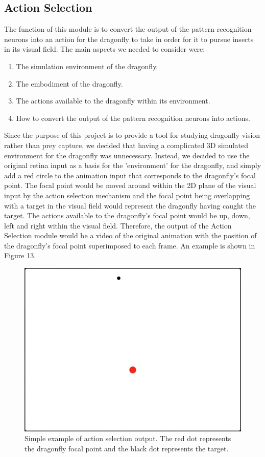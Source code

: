 \documentclass[a4paper,11pt]{article}
\begin{document}
\subsection{Action Selection}

The function of this module is to convert the output of the pattern recognition neurons into an action for the dragonfly to take in order for it to pursue insects in its visual field.
The main aspects we needed to consider were:
\begin{enumerate}
	\item The simulation environment of the dragonfly.
	\item The embodiment of the dragonfly.
	\item The actions available to the dragonfly within its environment.
	\item How to convert the output of the pattern recognition neurons into actions.
\end{enumerate}


	Since the purpose of this project is to provide a tool for studying dragonfly vision rather than prey capture, we decided that having a complicated 3D simulated environment for the dragonfly was unnecessary. Instead, we decided to use the original retina input as a basis for the 'environment' for the dragonfly, and simply add a red circle to the animation input that corresponds to the dragonfly's focal point. The focal point would be moved around within the 2D plane of the visual input by the action selection mechanism and the focal point being overlapping with a target in the visual field would represent the dragonfly having caught the target. The actions available to the dragonfly's focal point would be up, down, left and right within the visual field. Therefore, the output of the Action Selection module would be a video of the original animation with the position of the dragonfly's focal point superimposed to each frame. An example is shown in Figure 13.

\begin{figure}[H]
\centering
\includegraphics[scale = 0.3]{as_example}
\caption{Simple example of action selection output. The red dot represents the dragonfly focal point and the black dot represents the target.}
\end{figure}
\end{document}
